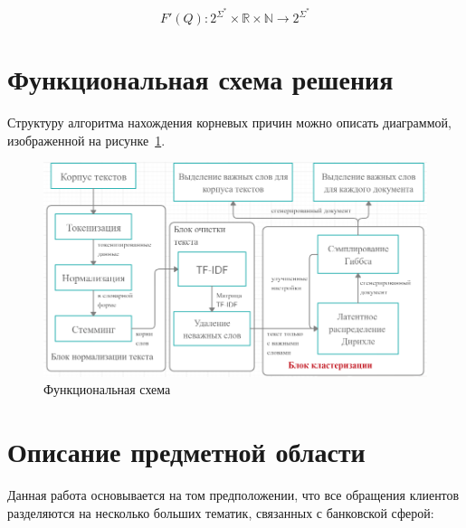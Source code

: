 \documentclass[a4paper,12pt,preview]{report} %
\begin{document}
	\begin{equation}
	F'(Q) : 2^{\Sigma^\ast} \times \mathbb{R} \times \mathbb{N} \rightarrow 2^{\Sigma^\ast}
	\end{equation}  
	
	\newpage
	
	\section{Функциональная схема решения}
	
	Структуру алгоритма нахождения корневых причин можно описать диаграммой, изображенной на рисунке~\ref{fig:scheme}.
	
	\begin{figure}[H]
		\centering\includegraphics[scale=0.6]{SchemeFinal.PNG}
		\caption{Функциональная схема}
		\label{fig:scheme}
	\end{figure}
	
	\section{Описание предметной области}
	
	Данная работа основывается на том предположении, что все обращения клиентов разделяются на несколько больших тематик, связанных с банковской сферой:
	
\end{document}

